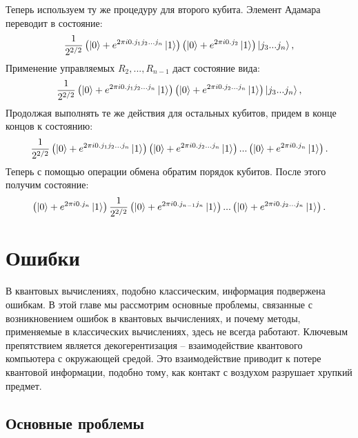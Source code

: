 \documentclass[12pt,a4paper]{article}
\begin{document}
	Теперь используем ту же процедуру для второго кубита. Элемент Адамара переводит в состояние:\\
	\begin{equation}
		\frac{1}{2^{2/2}}\left(\ket{0}+e^{2\pi i0.j_{1}j_{2}...j_{n}}\ket{1}\right)\left(\ket{0}+e^{2\pi i0.j_{2}}\ket{1}\right)\ket{j_{3}...j_{n}},
	\end{equation}
	Применение управляемых $R_{2},...,R_{n-1}$ даст состояние вида:\\
	\begin{equation}
		\frac{1}{2^{2/2}}\left(\ket{0}+e^{2\pi i0.j_{1}j_{2}...j_{n}}\ket{1}\right)\left(\ket{0}+e^{2\pi i0.j_{2}...j_{n}}\ket{1}\right)\ket{j_{3}...j_{n}},
	\end{equation}
	Продолжая выполнять те же действия для остальных кубитов, придем в конце концов к состоянию:\\
	\begin{equation}
		\frac{1}{2^{2/2}}\left(\ket{0}+e^{2\pi i0.j_{1}j_{2}...j_{n}}\ket{1}\right)\left(\ket{0}+e^{2\pi i0.j_{2}...j_{n}}\ket{1}\right)...\left(\ket{0}+e^{2\pi i0.j_{n}}\ket{1}\right).
	\end{equation}
	Теперь с помощью операции обмена обратим порядок кубитов. После этого получим состояние:\\
	
	\begin{equation}\left(\ket{0}+e^{2\pi i0.j_{n}}\ket{1}\right)
		\frac{1}{2^{2/2}}\left(\ket{0}+e^{2\pi i0.j_{n-1}j_{n}}\ket{1}\right)...\left(\ket{0}+e^{2\pi i0.j_{2}...j_{n}}\ket{1}\right).
	\end{equation}

\section{Ошибки}
В квантовых вычислениях, подобно классическим, информация подвержена ошибкам. В этой главе мы рассмотрим основные проблемы, связанные с возникновением ошибок в квантовых вычислениях, и почему методы, применяемые в классических вычислениях, здесь не всегда работают. Ключевым препятствием является декогерентизация – взаимодействие квантового компьютера с окружающей средой. Это взаимодействие приводит к потере квантовой информации, подобно тому, как контакт с воздухом разрушает хрупкий предмет.
\subsection{Основные проблемы}
\end{document}
